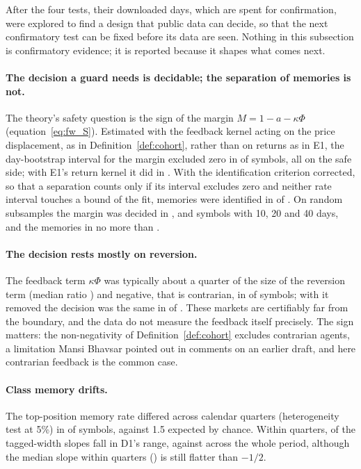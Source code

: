 After the four tests, their downloaded days, which are spent for confirmation, were explored to find a design that public data can decide, so that the next confirmatory test can be fixed before its data are seen. Nothing in this subsection is confirmatory evidence; it is reported because it shapes what comes next.

\paragraph{The decision a guard needs is decidable; the separation of memories is not.} The theory's safety question is the sign of the margin $M=1-a-\kappa\Phi$ (equation~\eqref{eq:fw_S}). Estimated with the feedback kernel acting on the price displacement, as in Definition~\ref{def:cohort}, rather than on returns as in E1, the day-bootstrap interval for the margin excluded zero in \PilotMarginX{} of \PilotSymbols{} symbols, all on the safe side; with E1's return kernel it did in \PilotMarginRet{}. With the identification criterion corrected, so that a separation counts only if its interval excludes zero and neither rate interval touches a bound of the fit, memories were identified in \PilotIdentified{} of \PilotSymbols{}. On random subsamples the margin was decided in \PilotCurveTen{}, \PilotCurveTwenty{} and \PilotCurveForty{} symbols with 10, 20 and 40 days, and the memories in no more than \PilotIdMax{}.

\paragraph{The decision rests mostly on reversion.} The feedback term $\kappa\Phi$ was typically about a quarter of the size of the reversion term (median ratio \PilotFbRatio{}) and negative, that is contrarian, in \PilotFbNeg{} of \PilotSymbols{} symbols; with it removed the decision was the same in \PilotSame{} of \PilotSymbols{}. These markets are certifiably far from the boundary, and the data do not measure the feedback itself precisely. The sign matters: the non-negativity of Definition~\ref{def:cohort} excludes contrarian agents, a limitation Mansi Bhavsar pointed out in comments on an earlier draft, and here contrarian feedback is the common case.

\paragraph{Class memory drifts.} The top-position memory rate differed across calendar quarters (heterogeneity test at 5\%) in \PilotDrift{} of \PilotSymbols{} symbols, against 1.5 expected by chance. Within quarters, \PilotWithinIn{} of the tagged-width slopes fall in D1's range, against \PilotAcrossIn{} across the whole period, although the median slope within quarters (\PilotWithinSlope{}) is still flatter than $-1/2$.

